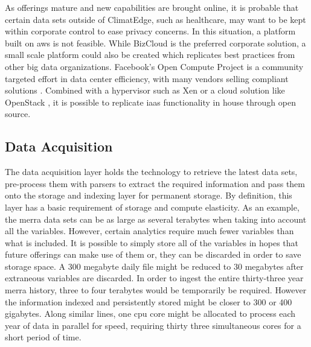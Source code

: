 As offerings mature and new capabilities are brought online, it is probable that certain data sets outside of ClimatEdge\texttrademark{}, such as healthcare, may want to be kept within corporate control to ease privacy concerns. In this situation, a platform built on \gls{aws} is not feasible. While BizCloud is the preferred corporate solution, a small scale platform could also be created which replicates best practices from other big data organizations. Facebook's Open Compute Project is a community targeted effort in data center efficiency, with many vendors selling compliant solutions \cite{opencompute}. Combined with a hypervisor such as Xen \cite{xen} or a cloud solution like OpenStack \cite{openstack}, it is possible to replicate \gls{iaas} functionality in house through open source.
\subsection{Data Acquisition}
The data acquisition layer holds the technology to retrieve the latest data sets, pre-process them with parsers  to extract the required information and pass them onto the storage and indexing layer for permanent storage. By definition, this layer has a basic requirement of storage and compute elasticity. As an example, the \gls{merra} data sets can be as large as several terabytes when taking into account all the variables. However, certain analytics require much fewer variables than what is included. It is possible to simply store all of the variables in hopes that future offerings can make use of them or, they can be discarded in order to save storage space. A 300 megabyte daily file might be reduced to 30 megabytes after extraneous variables are discarded.  In order to ingest the entire thirty-three year \gls{merra} history, three to four terabytes would be temporarily be required. However the information indexed and persistently stored might be closer to 300 or 400 gigabytes. Along similar lines, one \gls{cpu} core might be allocated to process each year of data in parallel for speed, requiring thirty three simultaneous cores for a short period of time. \\


